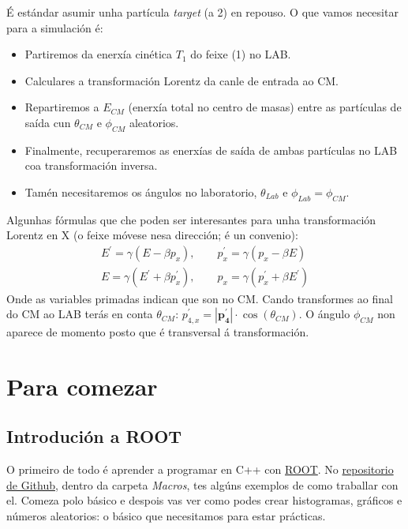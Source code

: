 \documentclass[11pt, a4paper]{article}
\newcommand{\vect}[1]{\boldsymbol{#1}}
\begin{document}
É estándar asumir unha partícula \textit{target} (a 2) en repouso. O que vamos necesitar para a simulación é:
\begin{itemize}
    \item Partiremos da enerxía cinética $T_1$ do feixe (1) no LAB.
    \item Calculares a transformación Lorentz da canle de entrada ao CM.
    \item Repartiremos a $E_{CM}$ (enerxía total no centro de masas) entre as partículas de saída cun $\theta_{CM}$ e $\phi_{CM}$ aleatorios.
    \item Finalmente, recuperaremos as enerxías de saída de ambas partículas no LAB coa transformación inversa.
    \item Tamén necesitaremos os ángulos no laboratorio, $\theta_{Lab}$ e $\phi_{Lab} = \phi_{CM}$.
\end{itemize}

Algunhas fórmulas que che poden ser interesantes para unha transformación Lorentz en X (o feixe móvese nesa dirección; é un convenio):
\begin{gather*}
    E^{\prime} = \gamma \left(E - \beta p_x\right), \qquad p^{\prime}_{x} = \gamma \left(p_x - \beta E\right)\\
    E = \gamma \left(E^{\prime} + \beta p_{x}^{\prime}\right), \qquad p_x = \gamma \left(p^{\prime}_x + \beta E^{\prime}\right)
\end{gather*}
Onde as variables primadas indican que son no CM. Cando transformes ao final do CM ao LAB terás en conta $\theta_{CM}$: $p_{4,x}^{\prime} = |\vect{p^{\prime}_4}| \cdot\cos(\theta_{CM})$. O ángulo $\phi_{CM}$ non aparece de momento posto que é transversal á transformación.

\section{Para comezar}
\subsection{Introdución a ROOT}
O primeiro de todo é aprender a programar en C++ con \href{https://root.cern.ch/}{ROOT}. No \href{https://github.com/Practicas24/Practicas_24}{repositorio de Github}, dentro da carpeta \textit{Macros}, tes algúns exemplos de como traballar con el. Comeza polo básico e despois vas ver como podes crear histogramas, gráficos e números aleatorios: o básico que necesitamos para estar prácticas.
\end{document}

